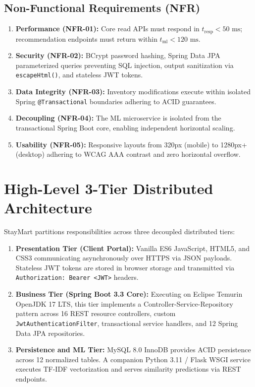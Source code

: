 \subsection{Non-Functional Requirements (NFR)}
\begin{enumerate}
    \item \textbf{Performance (NFR-01):} Core read APIs must respond in $t_{\text{resp}} < 50\text{ ms}$; recommendation endpoints must return within $t_{\text{ml}} < 120\text{ ms}$.
    \item \textbf{Security (NFR-02):} BCrypt password hashing, Spring Data JPA parameterized queries preventing SQL injection, output sanitization via \texttt{escapeHtml()}, and stateless JWT tokens.
    \item \textbf{Data Integrity (NFR-03):} Inventory modifications execute within isolated Spring \texttt{@Transactional} boundaries adhering to ACID guarantees.
    \item \textbf{Decoupling (NFR-04):} The ML microservice is isolated from the transactional Spring Boot core, enabling independent horizontal scaling.
    \item \textbf{Usability (NFR-05):} Responsive layouts from 320px (mobile) to 1280px+ (desktop) adhering to WCAG AAA contrast and zero horizontal overflow.
\end{enumerate}

\section{High-Level 3-Tier Distributed Architecture}
StayMart partitions responsibilities across three decoupled distributed tiers:
\begin{enumerate}
    \item \textbf{Presentation Tier (Client Portal):} Vanilla ES6 JavaScript, HTML5, and CSS3 communicating asynchronously over HTTPS via JSON payloads. Stateless JWT tokens are stored in browser storage and transmitted via \texttt{Authorization: Bearer <JWT>} headers.
    \item \textbf{Business Tier (Spring Boot 3.3 Core):} Executing on Eclipse Temurin OpenJDK 17 LTS, this tier implements a Controller-Service-Repository pattern across 16 REST resource controllers, custom \texttt{JwtAuthenticationFilter}, transactional service handlers, and 12 Spring Data JPA repositories.
    \item \textbf{Persistence and ML Tier:} MySQL 8.0 InnoDB provides ACID persistence across 12 normalized tables. A companion Python 3.11 / Flask WSGI service executes TF-IDF vectorization and serves similarity predictions via REST endpoints.
\end{enumerate}

